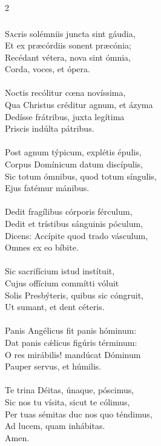 \documentclass[9pt,twoside]{extarticle}
\begin{document}
\begin{multicols}{2}
\subsubsection*{\center{}}
\lettrine{S}acris solémniis juncta sint gáudia,\\ Et ex præcórdiis sonent præcónia;\\ Recédant vétera, nova sint ómnia,\\ Corda, voces, et ópera.\\
\\
Noctis recólitur cœna novíssima,\\ Qua Christus créditur agnum, et ázyma\\ Dedísse frátribus, juxta legítima\\ Priscis indúlta pátribus.\\
\\
Post agnum týpicum, explétis épulis,\\ Corpus Domínicum datum discípulis,\\ Sic totum ómnibus, quod totum síngulis,\\ Ejus fatémur mánibus.\\
\\
Dedit fragílibus córporis férculum,\\ Dedit et trístibus sánguinis póculum,\\ Dicens: Accípite quod trado vásculum,\\ Omnes ex eo bíbite.\\
\\
Sic sacrifícium istud instítuit,\\ Cujus offícium commítti vóluit\\ Solis Presbýteris, quibus sic cóngruit,\\ Ut sumant, et dent céteris.\\
\\
Panis Angélicus fit panis hóminum:\\ Dat panis cǽlicus figúris términum:\\ O res mirábilis! mandúcat Dóminum\\ Pauper servus, et húmilis.\\
\\
Te trina Déitas, únaque, póscimus,\\ Sic nos tu vísita, sicut te cólimus,\\ Per tuas sémitas duc nos quo téndimus,\\ Ad lucem, quam inhábitas.\\
Amen.


\end{multicols}
\end{document}
